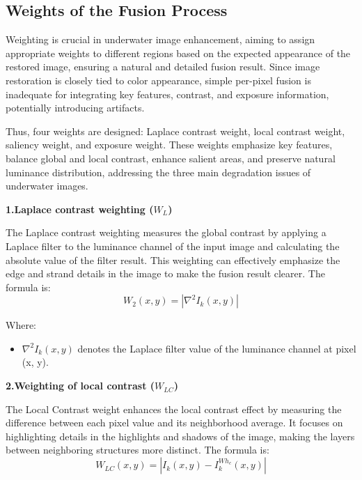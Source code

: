 \documentclass[withoutpreface,bwprint]{cumcmthesis}
\begin{document}
\subsection{Weights of the Fusion Process}

Weighting is crucial in underwater image enhancement, aiming to assign appropriate weights to different regions based on the expected appearance of the restored image, ensuring a natural and detailed fusion result. Since image restoration is closely tied to color appearance, simple per-pixel fusion is inadequate for integrating key features, contrast, and exposure information, potentially introducing artifacts. 

Thus, four weights are designed: Laplace contrast weight, local contrast weight, saliency weight, and exposure weight. These weights emphasize key features, balance global and local contrast, enhance salient areas, and preserve natural luminance distribution, addressing the three main degradation issues of underwater images.

\vspace{0.5em}
\textbf{1.Laplace contrast weighting ($W_{L}$)}

The Laplace contrast weighting measures the global contrast by applying a Laplace filter to the luminance channel of the input image and calculating the absolute value of the filter result. This weighting can effectively emphasize the edge and strand details in the image to make the fusion result clearer. The formula is:
\[W_2(x, y) = \left| \nabla^2 I_k(x, y) \right|\]

Where:

\begin{itemize}[itemindent=2em]

    \item $\nabla^2 I_k(x, y)$ denotes the Laplace filter value of the luminance channel at pixel (x, y).
    
\end{itemize}

\vspace{0.5em}
\textbf{2.Weighting of local contrast ($W_{LC}$)}

The Local Contrast weight enhances the local contrast effect by measuring the difference between each pixel value and its neighborhood average. It focuses on highlighting details in the highlights and shadows of the image, making the layers between neighboring structures more distinct. The formula is:
\[W_{LC}(x, y) = \left| I_k(x, y) - I_k^{Wh_c}(x, y) \right|\]
\end{document}
